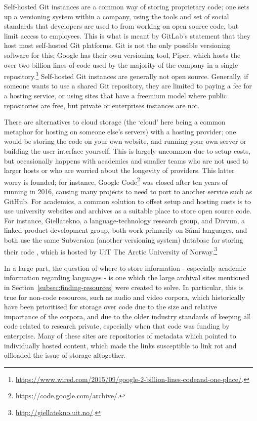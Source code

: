 Self-hosted Git instances are a common way of storing proprietary code; one sets up a versioning system within a company, using the tools and set of social standards that developers are used to from working on open source code, but limit access to employees. This is what is meant by GitLab's statement that they host most self-hosted Git platforms. Git is not the only possible versioning software for this; Google has their own versioning tool, Piper, which hosts the over two billion lines of code used by the majority of the company in a single repository.\footnote{\href{https://www.wired.com/2015/09/google-2-billion-lines-codeand-one-place/}{https://www.wired.com/2015/09/google-2-billion-lines-codeand-one-place/}. } Self-hosted Git instances are generally not open source. Generally, if someone wants to use a shared Git repository, they are limited to paying a fee for a hosting service, or using sites that have a freemium model where public repositories are free, but private or enterprises instances are not.

There are alternatives to cloud storage (the `cloud' here being a common metaphor for hosting on someone else's servers) with a hosting provider; one would be storing the code on your own website, and running your own server or building the user interface yourself. This is largely uncommon due to setup costs, but occasionally happens with academics and smaller teams who are not used to larger hosts or who are worried about the longevity of providers. This latter worry is founded; for instance, Google Code\footnote{\href{https://code.google.com/archive/}{https://code.google.com/archive/}. } was closed after ten years of running in 2016, causing many projects to need to port to another service such as GitHub. For academics, a common solution to offset setup and hosting costs is to use university websites and archives as a suitable place to store open source code. For instance, Giellatekno, a language-technology research group, and Divvun, a linked product development group, both work primarily on S\'ami languages, and both use the same Subversion (another versioning system) database for storing their code \citep{moshagenopen}, which is hosted by UiT The Arctic University of Norway.\footnote{\href{http://giellatekno.uit.no/}{http://giellatekno.uit.no/}. }

In a large part, the question of where to store information - especially academic information regarding languages - is one which the large archival sites mentioned in Section~\ref{subsec:finding-resources} were created to solve. In particular, this is true for non-code resources, such as audio and video corpora, which historically have been prioritised for storage over code due to the size and relative importance of the corpora, and due to the older industry standards of keeping all code related to research private, especially when that code was funding by enterprise. Many of these sites are repositories of metadata which pointed to individually hosted content, which made the links susceptible to link rot and offloaded the issue of storage altogether.

